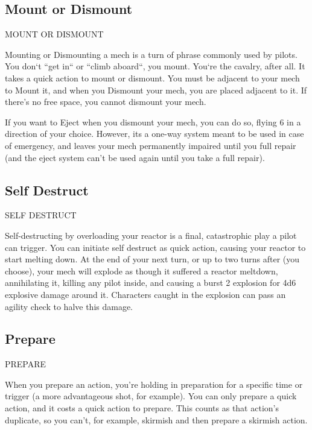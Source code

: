                                                                                                          

\subsection{Mount or Dismount}
                                     MOUNT OR DISMOUNT   

Mounting or Dismounting a mech is a turn of phrase commonly used by pilots. You don‘t “get  
in“ or “climb aboard“, you mount. You‘re the cavalry, after all. It takes a quick action to mount or  
dismount. You must be adjacent to your mech to Mount it, and when you Dismount your mech,  
you are placed adjacent to it. If there’s no free space, you cannot dismount your mech.
 

If you want to Eject when you dismount your mech, you can do so, flying 6 in a direction of your  
choice. However, its a one-way system meant to be used in case of emergency, and leaves your  
mech permanently impaired until you full repair (and the eject system can’t be used again until  
you take a full repair).
 
\subsection{Self Destruct}
                                          SELF DESTRUCT  

Self-destructing by overloading your reactor is a final, catastrophic play a pilot can trigger. You  
can initiate self destruct as quick action, causing your reactor to start melting down. At the end  
of your next turn, or up to two turns after (you choose), your mech will explode as though it  
suffered a reactor meltdown, annihilating it, killing any pilot inside, and causing a burst 2  
explosion for 4d6 explosive damage around it. Characters caught in the explosion can pass an  
agility check to halve this damage.  
\subsection{Prepare}
                                                PREPARE  

When you prepare an action, you’re holding in preparation for a specific time or trigger (a more  
advantageous shot, for example). You can only prepare a quick action, and it costs a quick  
action to prepare. This counts as that action’s duplicate, so you can’t, for example, skirmish and  
then prepare a skirmish action.
 

